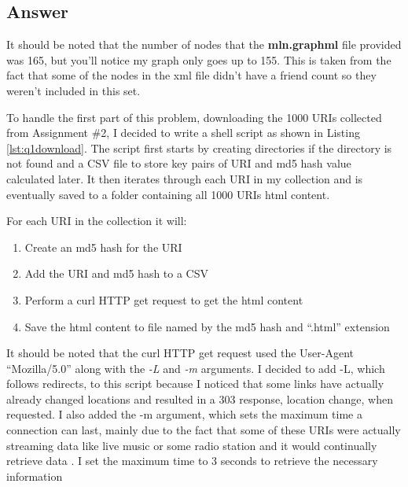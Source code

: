\documentclass[letterpaper,11pt]{article}
\newcommand*{\srcPath}{../src}%
\begin{document}
\subsection*{Answer}

It should be noted that the number of nodes that the \textbf{mln.graphml} file provided was 165, but you'll notice my graph only goes up to 155. This is taken from the fact that some of the nodes in the xml file didn't have a friend count so they weren't included in this set.

To handle the first part of this problem, downloading the 1000 URIs collected from Assignment \#2, I decided to write a shell script as shown in Listing \ref{lst:q1download}. The script first starts by creating directories if the directory is not found and a CSV file to store key pairs of URI and md5 hash value calculated later. It then iterates through each URI in my collection and is eventually saved to a folder containing all 1000 URIs html content. 

For each URI in the collection it will: 
\begin{enumerate}
    \item Create an md5 hash for the URI
    \item Add the URI and md5 hash to a CSV
    \item Perform a curl HTTP get request to get the html content
    \item Save the html content to file named by the md5 hash and ``.html'' extension
\end{enumerate}

It should be noted that the curl HTTP get request used the User-Agent ``Mozilla/5.0'' along with the \emph{-L} and \emph{-m} arguments. I decided to add -L, which follows redirects, to this script because I noticed that some links have actually already changed locations and resulted in a 303 response, location change, when requested. I also added the -m argument, which sets the maximum time a connection can last, mainly due to the fact that some of these URIs were actually streaming data like live music or some radio station and it would continually retrieve data \cite{curlref}. I set the maximum time to 3 seconds to retrieve the necessary information


\end{document}

